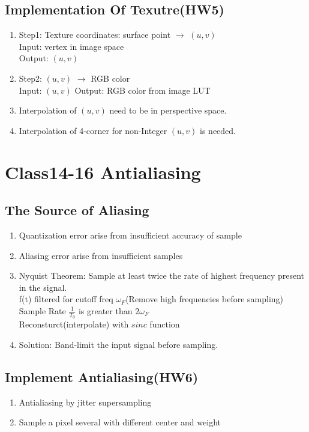 \documentclass[cyan,normal,en]{elegantnote}
\begin{document}
\subsection{Implementation Of Texutre(HW5)}
\begin{enumerate}
	\item Step1: Texture coordinates: surface point $\rightarrow$ $(u,v)$\\
	Input: vertex in image space\\
	Output: $(u,v)$
	\item Step2: $(u,v)$ $\rightarrow$ RGB color\\
	Input: $(u,v)$
	Output: RGB color from image LUT
	\item Interpolation of $(u,v)$ need to be in perspective space.
	\item Interpolation of 4-corner for non-Integer $(u,v)$ is needed.
\end{enumerate}
\newpage

\section{Class14-16 Antialiasing}
\subsection{The Source of Aliasing}
\begin{enumerate}
	\item Quantization error arise from insufficient accuracy of sample
	\item Aliasing error arise from insufficient samples
	\item Nyquist Theorem: Sample at least twice the rate of highest frequency present in the signal.\\
	f(t) filtered for cutoff freq $\omega_F$(Remove high frequencies before sampling)\\
	Sample Rate $\frac{1}{T_0}$ is greater than $2\omega_F$\\
	Reconsturct(interpolate) with $sinc$ function
	\item Solution: Band-limit the input signal before sampling.
\end{enumerate}
\subsection{Implement Antialiasing(HW6)}
\begin{enumerate}
	\item Antialiasing by jitter supersampling
	\item Sample a pixel several with different center and weight
\end{enumerate}
\end{document}
